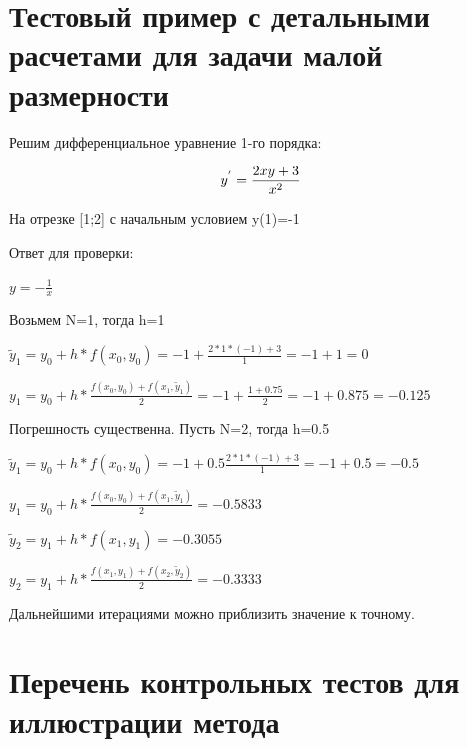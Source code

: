 \section{Тестовый пример с детальными расчетами для задачи малой размерности}

Решим дифференциальное уравнение 1-го порядка:

\begin{equation}
	y^{'}=\frac{2xy+3}{x^{2}} \\
\end{equation}

На отрезке [1;2] с начальным условием y(1)=-1

Ответ для проверки:

\begin{math}
	y=-\frac{1}{x}
\end{math}

Возьмем N=1, тогда h=1

\begin{math}
      \tilde y_{1}=y_{0}+h*f(x_{0},y_{0})=-1+\frac{2*1*(-1)+3}{1}=-1+1=0   
\end{math}

\begin{math}
	y_{1}=y_{0}+h*\frac{f(x_{0},y_{0})+f(x_{1},\tilde y_{1})}{2}= -1+\frac{1+0.75}{2}=-1+0.875=-0.125
\end{math}

Погрешность существенна. Пусть N=2, тогда h=0.5

\begin{math}
	\tilde y_{1}=y_{0}+h*f(x_{0},y_{0})=-1+0.5\frac{2*1*(-1)+3}{1}=-1+0.5=-0.5   
\end{math}

\begin{math}
	y_{1}=y_{0}+h*\frac{f(x_{0},y_{0})+f(x_{1},\tilde y_{1})}{2}=-0.5833
\end{math}

\begin{math}
	\tilde y_{2}=y_{1}+h*f(x_{1},y_{1})=-0.3055   
\end{math}

\begin{math}
	y_{2}=y_{1}+h*\frac{f(x_{1},y_{1})+f(x_{2},\tilde y_{2})}{2}=-0.3333
\end{math}
 
Дальнейшими итерациями можно приблизить значение к точному.
  
\section{Перечень контрольных тестов для иллюстрации метода}

